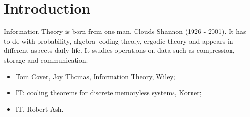 \chapter{Introduction}
Information Theory is born from one man, Cloude Shannon (1926 - 2001). It has to do with probability, algebra, coding theory, ergodic theory and appears in different aspects daily life. It studies operations on data such as compression, storage and communication.

\begin{itemize}
	\item Tom Cover, Joy Thomas, Information Theory, Wiley;
	\item IT: cooling theorems for discrete memoryless systems, Korner;
	\item IT, Robert Ash.
\end{itemize}




